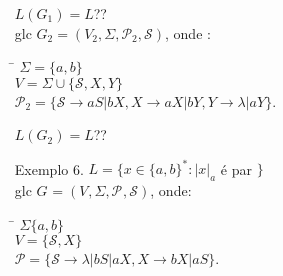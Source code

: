 \documentclass{article}
\newcommand{\gram}[1]{G_{#1} = (V_{#1},\Sigma,\mathcal{P}_{#1},\mathcal{S})}
\begin{document}
\begin{enumerate}
            $L(G_1) = L $??\\
            glc $ \gram{2} $, onde :
            \begin{tabbing}
                \hspace{0.5cm}  \= $ \Sigma = \{a,b\} $\\
                                \> $ V = \Sigma \cup \{ , X, Y \} $\\
                                \> $ _2 = \{  \rightarrow aS | bX,
                                                        X \rightarrow aX | bY,
                                                        Y \rightarrow \lambda|aY \} $.
            \end{tabbing}
            $L(G_2) = L $??\\
        \item [Exemplo 6.] $ L = \{ x \in \{a,b\}^* : |x|_a $ é par $ \} $ \\
            glc $\gram{}$, onde:
            \begin{tabbing}
                \hspace{0.5cm}  \= $ \Sigma\{a,b\} $\\
                                \> $ V = \{, X \} $\\
                                \> $  = \{   \rightarrow \lambda | bS | aX,
                                                    X \rightarrow bX | aS \} $.
            \end{tabbing}
    \end{enumerate}
\end{document}
